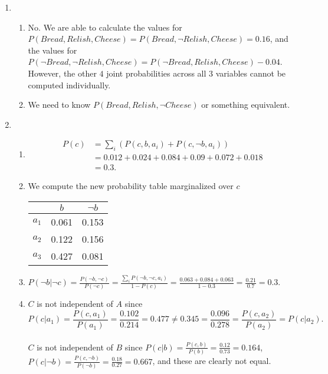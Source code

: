 \documentclass[10pt,oneside,reqno]{amsart}
\theoremstyle{plain}
\theoremstyle{definition}
\begin{document}
\begin{enumerate}[label=\arabic*.]
\begin{enumerate}
\end{enumerate}

\item 
\begin{enumerate}

\item No. We are able to calculate the values for $P(Bread, Relish, Cheese) = P(Bread, \neg Relish, Cheese)  = 0.16$, and the values for $P(\neg Bread, \neg Relish, Cheese) = P(\neg Bread, Relish, Cheese) - 0.04$. However, the other $4$ joint probabilities across all 3 variables cannot be computed individually. 

\item We need to know $P(Bread, Relish, \neg Cheese)$ or something equivalent. 

\end{enumerate}

\item 

\begin{enumerate}

\item 
\begin{equation}
\begin{aligned}
P(c) &= \sum_i \left(P(c,b,a_i) + P(c,\neg b, a_i)\right)\\
& = 0.012 + 0.024 + 0.084 + 0.09 + 0.072 + 0.018\\
& = 0.3. 
\end{aligned}
\end{equation}

\item We compute the new probability table marginalized over $c$\\
\begin{tabular}{c|cc}
 & $b$ & $\neg b$\\
 \hline
$a_1$ & 0.061 & 0.153\\
$a_2$ & 0.122 & 0.156\\
$a_3$ & 0.427 & 0.081\\

\end{tabular}

\item $P(\neg b|\neg c) = \frac{P(\neg b, \neg c)}{P(\neg c)} = \frac{\sum_i P(\neg b, \neg c,a_i)}{1 - P(c)} = \frac{0.063 + 0.084 + 0.063}{1 - 0.3} = \frac{0.21}{0.7} = 0.3. $

\item $C$ is not independent of $A$ since 
\[P(c|a_1) = \frac{P(c,a_1)}{P(a_1)} = \frac{0.102}{0.214} = 0.477 \neq  0.345 = \frac{0.096}{0.278} =\frac{P(c,a_2)}{P(a_2)} =  P(c|a_2).\] \\
$C$ is not independent of $B$ since $P(c|b) = \frac{P(c,b)}{P(b)} = \frac{0.12}{0.73} = 0.164$,\\ $P(c| \neg b) = \frac{P(c,\neg b)}{P(\neg b)} = \frac{0.18}{0.27} = 0.667$, and these are clearly not equal. 


\end{enumerate}
\end{enumerate}
\end{document}
